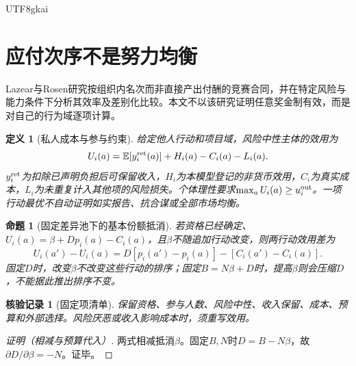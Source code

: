 \documentclass[12pt,a4paper,openany]{report}
\newtheorem{definition}{定义}[chapter]
\newtheorem{proposition}{命题}[chapter]
\newtheorem{Certificate}{核验记录}[chapter]
\newcommand{\EE}{\mathbb E}
\begin{document}
\begin{CJK*}{UTF8}{gkai}
\section{应付次序不是努力均衡}
Lazear与Rosen研究按组织内名次而非直接产出付酬的竞赛合同，并在特定风险与能力条件下分析其效率及差别化比较\cite{LazearRosen1981}。本文不以该研究证明任意奖金制有效，而是对自己的行为域逐项计算。
\begin{definition}[私人成本与参与约束]
\label{def:utility}
给定他人行动和项目域，风险中性主体的效用为
\[
 U_i(a)=\EE[y_i^{\rm ret}(a)]+H_i(a)-C_i(a)-L_i(a).
\]
$y_i^{\rm ret}$为扣除已声明负担后可保留收入，$H_i$为本模型登记的非货币效用，$C_i$为真实成本，$L_i$为未重复计入其他项的风险损失。个体理性要求$\max_aU_i(a)\ge u_i^{\rm out}$。一项行动最优不自动证明如实报告、抗合谋或全部市场均衡。
\end{definition}
\begin{proposition}[固定差异池下的基本份额抵消]
\label{prop:base-cancel}
若资格已经确定、$U_i(a)=\beta+Dp_i(a)-C_i(a)$，且$\beta$不随追加行动改变，则两行动效用差为
\[
 U_i(a')-U_i(a)=D[p_i(a')-p_i(a)]-[C_i(a')-C_i(a)].
\]
固定$D$时，改变$\beta$不改变这些行动的排序；固定$B=N\beta+D$时，提高$\beta$则会压缩$D$，不能据此推出排序不变。
\end{proposition}
\begin{Certificate}[固定项清单]
保留资格、参与人数、风险中性、收入保留、成本、预算和外部选择。风险厌恶或收入影响成本时，须重写效用。
\end{Certificate}
\begin{proof}[证明（相减与预算代入）]
两式相减抵消$\beta$。固定$B,N$时$D=B-N\beta$，故$\partial D/\partial\beta=-N$。证毕。
\end{proof}


\end{CJK*}
\end{document}
